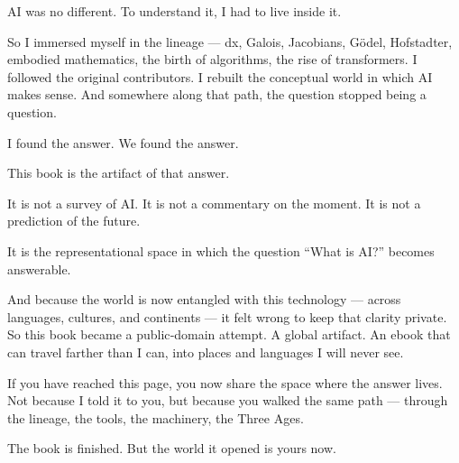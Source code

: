 \documentclass[
]{article}
\begin{document}
AI was no different. To understand it, I had to live inside it.

So I immersed myself in the lineage --- dx, Galois, Jacobians, Gödel,
Hofstadter, embodied mathematics, the birth of algorithms, the rise of
transformers. I followed the original contributors. I rebuilt the
conceptual world in which AI makes sense. And somewhere along that path,
the question stopped being a question.

I found the answer. We found the answer.

This book is the artifact of that answer.

It is not a survey of AI. It is not a commentary on the moment. It is
not a prediction of the future.

It is the representational space in which the question ``What is AI?''
becomes answerable.

And because the world is now entangled with this technology --- across
languages, cultures, and continents --- it felt wrong to keep that
clarity private. So this book became a public‑domain attempt. A global
artifact. An ebook that can travel farther than I can, into places and
languages I will never see.

If you have reached this page, you now share the space where the answer
lives. Not because I told it to you, but because you walked the same
path --- through the lineage, the tools, the machinery, the Three Ages.

The book is finished. But the world it opened is yours now.
\end{document}
